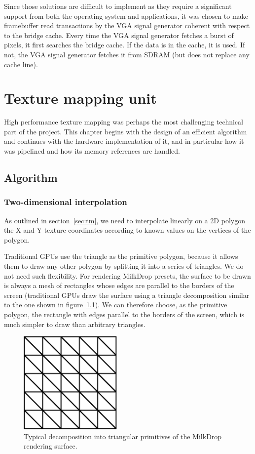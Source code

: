 \documentclass[a4paper,11pt]{kthesis}
\begin{document}
Since those solutions are difficult to implement as they require a significant support from both the operating system and applications, it was chosen to make framebuffer read transactions by the VGA signal generator coherent with respect to the bridge cache. Every time the VGA signal generator fetches a burst of pixels, it first searches the bridge cache. If the data is in the cache, it is used. If not, the VGA signal generator fetches it from SDRAM (but does not replace any cache line).

\chapter{Texture mapping unit}
\label{ch:tmu}
High performance texture mapping was perhaps the most challenging technical part of the project. This chapter begins with the design of an efficient algorithm and continues with the hardware implementation of it, and in particular how it was pipelined and how its memory references are handled.

\section{Algorithm}
\subsection{Two-dimensional interpolation}
As outlined in section~\ref{sec:tm}, we need to interpolate linearly on a 2D polygon the X and Y texture coordinates according to known values on the vertices of the polygon.

Traditional GPUs use the triangle as the primitive polygon, because it allows them to draw any other polygon by splitting it into a series of triangles. We do not need such flexibility. For rendering MilkDrop presets, the surface to be drawn is always a mesh of rectangles whose edges are parallel to the borders of the screen (traditional GPUs draw the surface using a triangle decomposition similar to the one shown in figure~\ref{fig:tridec}). We can therefore choose, as the primitive polygon, the rectangle with edges parallel to the borders of the screen, which is much simpler to draw than arbitrary triangles.

\begin{figure}[htp]
\centering
\includegraphics[height=50mm]{tridec.eps}
\caption{Typical decomposition into triangular primitives of the MilkDrop rendering surface.}
\label{fig:tridec}
\end{figure}
\end{document}
